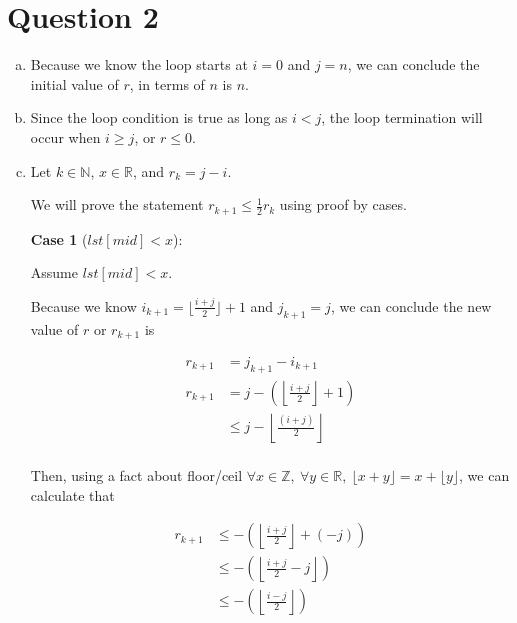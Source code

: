 \documentclass[12pt]{article}
\begin{document}
\section*{Question 2}
\begin{enumerate}[a.]
    \item
    Because we know the loop starts at $ i = 0$ and $j = n$, we can conclude the
    initial value of $r$, in terms of $n$ is $n$.

    \item
    Since the loop condition is true as long as $i < j$, the loop termination will
    occur when $i \geq j$, or $r \leq 0$.

    \item

    Let $k \in \mathbb{N}$, $x \in \mathbb{R}$, and $r_k = j - i$.

    \bigskip

    We will prove the statement $r_{k+1} \leq \frac{1}{2} r_k$ using proof by cases.

    \bigskip

    \textbf{Case 1} ($lst[mid] < x$):

    \bigskip

    Assume $lst[mid] < x$.

    \bigskip

    Because we know $i_{k+1} = \lfloor \frac{i + j}{2} \rfloor + 1$
    and $j_{k+1} = j$, we can conclude the new value of $r$ or $r_{k+1}$ is

    \setcounter{equation}{0}
    \begin{align}
        r_{k+1} &= j_{k+1}  - i_{k+1}\\
        r_{k+1} &= j - \left( \left\lfloor \frac{i+j}{2} \right\rfloor + 1 \right)\\
        &\leq j - \left\lfloor \frac{(i+j)}{2} \right\rfloor\\
    \end{align}

    \bigskip

    Then, using a fact about floor/ceil $\forall x \in \mathbb{Z},\:\forall y \in
    \mathbb{R},\:\lfloor x+y \rfloor = x + \lfloor y \rfloor$, we can calculate that

    \begin{align}
        r_{k+1} &\leq - \left( \left\lfloor \frac{i + j}{2} \right\rfloor + (-j) \right)\\
        &\leq - \left( \left\lfloor \frac{i + j}{2} - j \right\rfloor \right)\\
        &\leq - \left( \left\lfloor \frac{i - j}{2} \right\rfloor \right)
    \end{align}


\end{enumerate}
\end{document}
